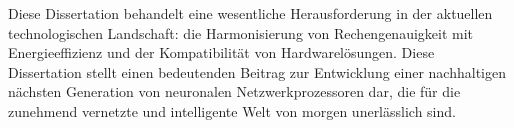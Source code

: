 Diese Dissertation behandelt eine wesentliche Herausforderung in der aktuellen technologischen Landschaft: die Harmonisierung von Rechengenauigkeit mit Energieeffizienz und der Kompatibilit\"at von Hardwarel\"osungen. Diese Dissertation stellt einen bedeutenden Beitrag zur Entwicklung einer nachhaltigen n\"achsten Generation von neuronalen Netzwerkprozessoren dar, die f\"ur die zunehmend vernetzte und intelligente Welt von morgen unerl\"asslich sind.
